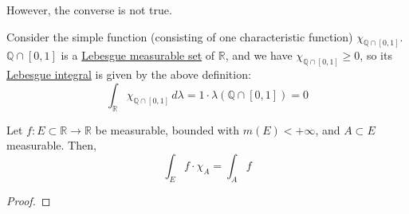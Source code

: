   However, the converse is not true. 

  \begin{example}
    \label{ex:lebesgue-integrable-but-not-riemann-integrable}
    Consider the simple function (consisting of one characteristic function) $\chi_{\mathbb{Q} \cap [0, 1]}$. $\mathbb{Q} \cap [0, 1]$ is a \hyperref[def:lebesgue-measurable-set]{Lebesgue measurable set} of $\mathbb{R}$, and we have $\chi_{\mathbb{Q} \cap [0, 1]} \geq 0$, so its \hyperref[def:leb-int-signed]{Lebesgue integral} is given by the above definition: 
    \begin{equation}
      \int_{\mathbb{R}} \chi_{\mathbb{Q} \cap [0, 1]} \, d\lambda = 1 \cdot \lambda(\mathbb{Q} \cap [0, 1]) = 0
    \end{equation}
  \end{example} 
  
  \begin{lemma}[Masking]
    \label{thm:masking}
    Let $f: E \subset \mathbb{R} \to \mathbb{R}$ be measurable, bounded with $m(E) < +\infty$, and $A \subset E$ measurable. Then, 
    \begin{equation}
      \int_E f \cdot \chi_A = \int_A f
    \end{equation}
  \end{lemma}
  \begin{proof}
    
  \end{proof}


